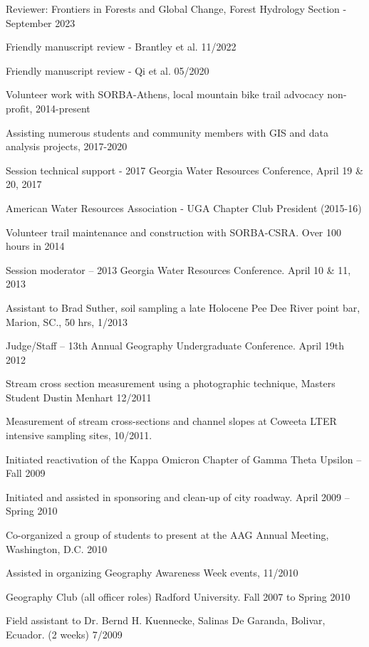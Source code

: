 \documentclass[10pt,letterpaper]{article}
\begin{document}
	\begin{itemize*}
		
		\item Reviewer: Frontiers in Forests and Global Change, Forest Hydrology Section - September 2023
		\item
		Friendly manuscript review - Brantley et al. 11/2022
		\item 
		Friendly manuscript review - Qi et al. 05/2020
		\item
		Volunteer work with SORBA-Athens, local mountain bike trail advocacy non-profit, 2014-present
		\item
		Assisting numerous students and community members with GIS and data analysis projects, 2017-2020
		\item
		Session technical support - 2017 Georgia Water Resources Conference, April 19 \& 20, 2017
		\item
		American Water Resources Association - UGA Chapter Club President (2015-16)
		\item
		Volunteer trail maintenance and construction with SORBA-CSRA. Over 100 hours in 2014
		\item
		Session moderator – 2013 Georgia Water Resources Conference. April 10 \& 11, 2013
		\item
		Assistant to Brad Suther, soil sampling a late Holocene Pee Dee River point bar, Marion, SC., 50 hrs, 1/2013
		\item
		Judge/Staff – 13th Annual Geography Undergraduate Conference. April 19th 2012
		\item
		Stream cross section measurement using a photographic technique, Masters Student Dustin Menhart 12/2011
		\item 
		Measurement of stream cross-sections and channel slopes at Coweeta LTER intensive sampling sites, 10/2011.
		\item 
		Initiated reactivation of the Kappa Omicron Chapter of Gamma Theta Upsilon – Fall 2009
		\item 
		Initiated and assisted in sponsoring and clean-up of city roadway. April 2009 – Spring 2010
		\item 
		Co-organized a group of students to present at the AAG Annual Meeting, Washington, D.C. 2010
		\item 
		Assisted in organizing Geography Awareness Week events, 11/2010
		\item 
		Geography Club (all officer roles) Radford University. Fall 2007 to Spring 2010
		\item 
		Field assistant to Dr. Bernd H. Kuennecke, Salinas De Garanda, Bolivar, Ecuador. (2 weeks) 7/2009
		
		
	\end{itemize*}
	
	
\end{document}
